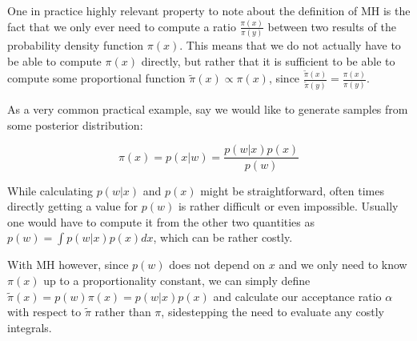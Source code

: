 One in practice highly relevant property to note about the definition of MH is the fact that we only ever need to compute a ratio $\frac{\pi(x)}{\pi(y)}$ between two results of the probability density function $\pi(x)$. This means that we do not actually have to be able to compute $\pi(x)$ directly, but rather that it is sufficient to be able to compute some proportional function $\tilde{\pi}(x) \propto \pi(x)$, since $\frac{\tilde{\pi}(x)}{\tilde{\pi}(y)} = \frac{\pi(x)}{\pi(y)}$.

As a very common practical example, say we would like to generate samples from some posterior distribution:

\begin{equation*}
\pi(x) = p(x | w) = \frac{p(w | x) p(x)}{p(w)}
\end{equation*}

While calculating $p(w | x)$ and $p(x)$ might be straightforward, often times directly getting a value for $p(w)$ is rather difficult or even impossible. Usually one would have to compute it from the other two quantities as $p(w) = \int p(w | x) p(x) dx$, which can be rather costly.

With MH however, since $p(w)$ does not depend on $x$ and we only need to know $\pi(x)$ up to a proportionality constant, we can simply define $\tilde{\pi}(x) = p(w) \pi(x) = p(w | x) p(x)$ and calculate our acceptance ratio $\alpha$ with respect to $\tilde{\pi}$ rather than $\pi$, sidestepping the need to evaluate any costly integrals.